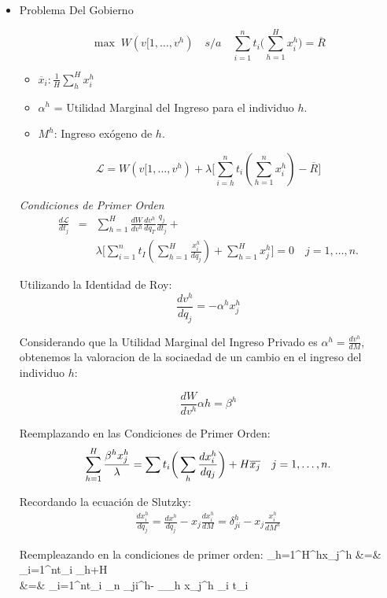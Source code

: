\begin{itemize}
	\item Problema Del Gobierno
	
	$$\max \; W(v[1,\ldots,v^h) \quad s/a \quad \sum_{i=1}^{n}t_i \bigg(\sum_{h=1}^{H}x_{i}^h\bigg)=\overline{R}$$
	
	\begin{itemize}
		\item $\overline{x}_i: \frac{1}{H} \sum_h^H x_i^h$
		\item $\alpha^h$ = Utilidad Marginal del Ingreso para el individuo $h$.
		\item $M^h$: Ingreso exógeno de $h$.
	\end{itemize}
	
	$$\mathscr{L}=W(v[1,\ldots,v^h)+\lambda \bigg[\sum_{i=h}^{n}t_i (\sum_{h=1}^{n}x_i^h)-\overline{R} \bigg]$$
	
	\emph{Condiciones de Primer Orden}
	\begin{eqnarray}	
		\frac{d\mathscr{L}}{dt_j}& =& \sum_{h=1}^{H}\frac{dW}{dv^h}\frac{dv^h}{dq_T}\frac{q_j}{dt_j}+{}
		\nonumber \\
		& & \lambda\bigg[\sum_{i=1}^{n}t_I (\sum_{h=1}^{H}\frac{x_i^h}{dq_j})+\sum_{h=1}^{H} x_{j}^{h} \bigg]=0 \quad j=1,\ldots,n. \nonumber
	\end{eqnarray}	
	
	Utilizando la Identidad de Roy: 
	$$\frac{dv^h}{dq_j}=-\alpha^h x_j^h$$
	
	Considerando que la Utilidad Marginal del Ingreso Privado es $ \alpha^h=\frac{dv^h}{dM}$, obtenemos la valoracion de la sociaedad de un cambio en el ingreso del individuo $h$:

	$$\frac{dW}{dv^h}\alpha h=\beta^h$$

	Reemplazando en las Condiciones de Primer Orden:
	$$\sum_{h=1}^H {\beta^hx_j^h \over \lambda}= \sum t_i \bigg(\sum_h \frac{dx_i^h}{dq_j}\bigg)+H\overline{x_j} \quad j=1,\ldots,n.$$
	
	Recordando la ecuación de Slutzky:
	\begin{eqnarray}
		\frac{dx_i^h}{dq_j} = \frac{dx^h}{dq_j}-x_j\frac{dx_i^h}{dM}= \delta_{ji}^h-x_j\frac{x_i^h}{dM^h} \label{slut3}
	\end{eqnarray}
	
	Reempleazando en la condiciones de primer orden:
	\bea
		\sum_{h=1}^{H}{\beta^hx_j^h \over \lambda} &=& \sum_{i=1}^{n}t_i \sum_{h}+H \\
		&=& \sum_{i=1}^{n}t_i \sum_n \delta_{ji}^h- _{\sum_h x_j^h \sum_i t_i }
	\eea
	

\end{itemize}
